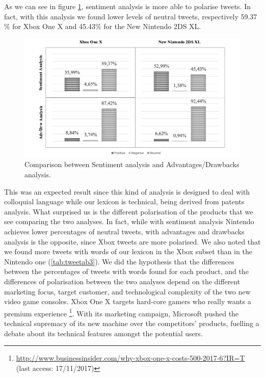 \documentclass[]{book}
\let\rmarkdownfootnote\footnote%
\def\footnote{\protect\rmarkdownfootnote}
\begin{document}
As we can see in figure \ref{fig:tweetsentres}, sentiment analysis is
more able to polarise tweets. In fact, with this analysis we found lower
levels of neutral tweets, respectively 59.37 \% for Xbox One X and
45.43\% for the New Nintendo 2DS XL.

\begin{figure}

{\centering \includegraphics[width=1\linewidth]{_bookdown_files/figures/tweet_sent_res} 

}

\caption{Comparison between Sentiment analysis and Advantages/Drawbacks analysis.}\label{fig:tweetsentres}
\end{figure}

This was an expected result since this kind of analysis is designed to
deal with colloquial language while our lexicon is technical, being
derived from patents analysis. What surprised us is the different
polarisation of the products that we see comparing the two analyses. In
fact, while with sentiment analysis Nintendo achieves lower percentages
of neutral tweets, with advantages and drawbacks analysis is the
opposite, since Xbox tweets are more polarised. We also noted that we
found more tweets with words of our lexicon in the Xbox subset than in
the Nintendo one (\ref{tab:tweetab3}). We did the hypothesis that the
differences between the percentages of tweets with words found for each
product, and the differences of polarisation between the two analyses
depend on the different marketing focus, target customer, and
technological complexity of the two new video game consoles. Xbox One X
targets hard-core gamers who really wants a premium experience
\footnote{\url{http://www.businessinsider.com/why-xbox-one-x-costs-500-2017-6?IR=T}
  (last access: 17/11/2017)}. With its marketing campaign, Microsoft
pushed the technical supremacy of its new machine over the competitors'
products, fuelling a debate about its technical features amongst the
potential users.
\end{document}

